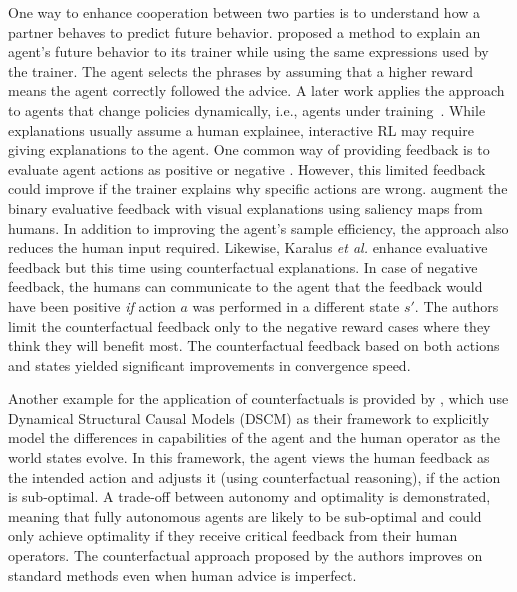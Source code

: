 \documentclass[twoside,11pt]{article}
\begin{document}
One way to enhance cooperation between two parties is to understand how a partner behaves to predict future behavior. \citet{fukuchi2017autonomous} proposed a method to explain an agent's future behavior to its trainer while using the same expressions used by the trainer. The agent selects the phrases by assuming that a higher reward means the agent correctly followed the advice. A later work applies the approach to agents that change policies dynamically, i.e., agents under training~\citep{fukuchi2017application}. While explanations usually assume a human explainee, interactive RL may require giving explanations to the agent. One common way of providing feedback is to evaluate agent actions as positive or negative \citep{Knox:2008:TAMER,knox:13,arakawa:18,macglashan2017interactive}. However, this limited feedback could improve if the trainer explains why specific actions are wrong. \citet{guan2020explanation} augment the binary evaluative feedback with visual explanations using saliency maps from humans. In addition to improving the agent's sample efficiency, the approach also reduces the human input required.  Likewise, Karalus \emph{et al.}  enhance evaluative feedback but this time using counterfactual explanations. In case of negative feedback, the humans can communicate to the agent that the feedback would have been positive \emph{if} action $a$ was performed in a different state $s'$. The authors limit the counterfactual feedback only to the negative reward cases where they think they will benefit most. The counterfactual feedback based on both actions and states yielded significant improvements in convergence speed. 

Another example for the application of counterfactuals is provided by \citep{Pearl:2009:Causality}, which use Dynamical Structural Causal Models (DSCM) as their framework to explicitly model the differences in capabilities of the agent and the human operator as the world states evolve. In this framework, the agent views the human feedback as the intended action and adjusts it (using counterfactual reasoning), if the action is sub-optimal. A trade-off between autonomy and optimality is demonstrated, meaning that fully autonomous agents are likely to be sub-optimal and could only achieve optimality if they receive critical feedback from their human operators. The counterfactual approach proposed by the authors improves on standard methods even when human advice is imperfect.
\end{document}

